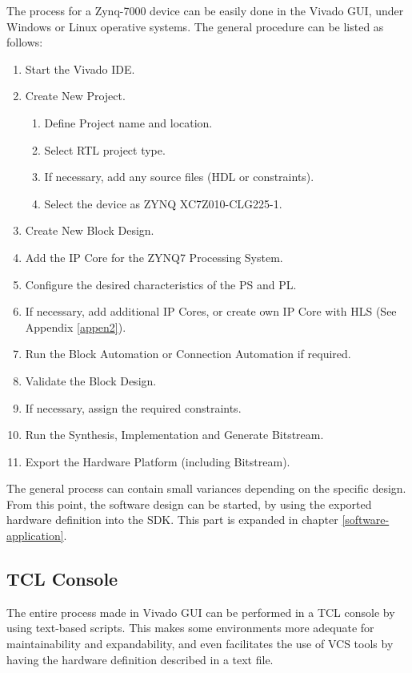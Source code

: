 The process for a Zynq-7000 device can be easily done in the Vivado GUI, under Windows or Linux operative systems. The general procedure can be listed as follows:

\begin{enumerate}
	\item Start the Vivado IDE.
	\item Create New Project.
	\begin{enumerate}
		\item Define Project name and location.
		\item Select RTL project type.
		\item If necessary, add any source files (HDL or constraints).
		\item Select the device as ZYNQ XC7Z010-CLG225-1.
	\end{enumerate}
	\item Create New Block Design.
	\item Add the IP Core for the ZYNQ7 Processing System.
	\item Configure the desired characteristics of the PS and PL.
	\item If necessary, add additional IP Cores, or create own IP Core with HLS (See Appendix \ref{appen2}).
	\item Run the Block Automation or Connection Automation if required.
	\item Validate the Block Design.
	\item If necessary, assign the required constraints.
	\item Run the Synthesis, Implementation and Generate Bitstream.
	\item Export the Hardware Platform (including Bitstream).
\end{enumerate}

The general process can contain small variances depending on the specific design. From this point, the software design can be started, by using the exported hardware definition into the SDK. This part is expanded in chapter \ref{software-application}.

\subsection{TCL Console}

The entire process made in Vivado GUI can be performed in a TCL console by using text-based scripts. This makes some environments more adequate for maintainability and expandability, and even facilitates the use of VCS tools by having the hardware definition described in a text file.

